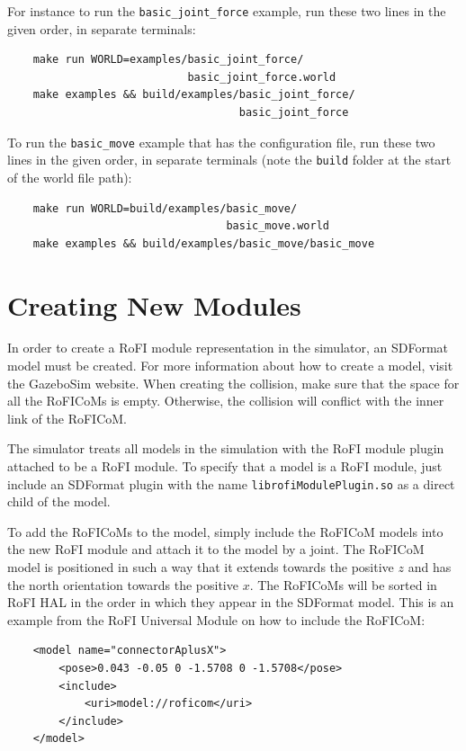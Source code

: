 \documentclass[
  printed, %
  color,   %
  notable, %
  oneside, %
  nolof,   %
  nolot,   %
  nocover,
]{fithesis3}
\newcommand{\code}[1]{\texttt{#1}}
\begin{document}
For instance to run the \code{basic\_joint\_force} example, run these two lines in the given order, in separate terminals:
\begin{center}
\begin{verbatim}
    make run WORLD=examples/basic_joint_force/
                            basic_joint_force.world
    make examples && build/examples/basic_joint_force/
                                    basic_joint_force
\end{verbatim}
\end{center}

To run the \code{basic\_move} example that has the configuration file, run these two lines in the given order, in separate terminals (note the \code{build} folder at the start of the world file path):
\begin{center}
\begin{verbatim}
    make run WORLD=build/examples/basic_move/
                                  basic_move.world
    make examples && build/examples/basic_move/basic_move
\end{verbatim}
\end{center}


\section{Creating New Modules}
\label{ex-modules}

In order to create a RoFI module representation in the simulator, an SDFormat model must be created.
For more information about how to create a model, visit the GazeboSim website\cite{gazebo-web}.
When creating the collision, make sure that the space for all the RoFICoMs is empty.
Otherwise, the collision will conflict with the inner link of the RoFICoM.

The simulator treats all models in the simulation with the RoFI module plugin attached to be a RoFI module.
To specify that a model is a RoFI module, just include an SDFormat plugin with the name \code{librofiModulePlugin.so} as a direct child of the model.

To add the RoFICoMs to the model, simply include the RoFICoM models into the new RoFI module and attach it to the model by a joint.
The RoFICoM model is positioned in such a way that it extends towards the positive $z$ and has the north orientation towards the positive $x$.
The RoFICoMs will be sorted in RoFI HAL in the order in which they appear in the SDFormat model.
This is an example from the RoFI Universal Module on how to include the RoFICoM:
\begin{center}
\begin{verbatim}
    <model name="connectorAplusX">
        <pose>0.043 -0.05 0 -1.5708 0 -1.5708</pose>
        <include>
            <uri>model://roficom</uri>
        </include>
    </model>
\end{verbatim}
\end{center}
\end{document}
